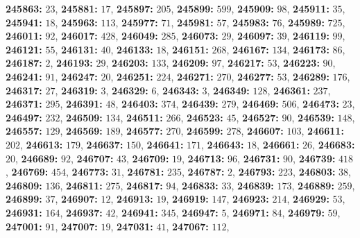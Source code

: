 \textsf{\bfseries 245863:} $23$, \textsf{\bfseries 245881:} $17$, \textsf{\bfseries 245897:} $205$, \textsf{\bfseries 245899:} $599$, \textsf{\bfseries 245909:} $98$, \textsf{\bfseries 245911:} $35$, \textsf{\bfseries 245941:} $18$, \textsf{\bfseries 245963:} $113$, \textsf{\bfseries 245977:} $71$, \textsf{\bfseries 245981:} $57$, \textsf{\bfseries 245983:} $76$, \textsf{\bfseries 245989:} $725$, \textsf{\bfseries 246011:} $92$, \textsf{\bfseries 246017:} $428$, \textsf{\bfseries 246049:} $285$, \textsf{\bfseries 246073:} $29$, \textsf{\bfseries 246097:} $39$, \textsf{\bfseries 246119:} $99$, \textsf{\bfseries 246121:} $55$, \textsf{\bfseries 246131:} $40$, \textsf{\bfseries 246133:} $18$, \textsf{\bfseries 246151:} $268$, \textsf{\bfseries 246167:} $134$, \textsf{\bfseries 246173:} $86$, \textsf{\bfseries 246187:} $2$, \textsf{\bfseries 246193:} $29$, \textsf{\bfseries 246203:} $133$, \textsf{\bfseries 246209:} $97$, \textsf{\bfseries 246217:} $53$, \textsf{\bfseries 246223:} $90$, \textsf{\bfseries 246241:} $91$, \textsf{\bfseries 246247:} $20$, \textsf{\bfseries 246251:} $224$, \textsf{\bfseries 246271:} $270$, \textsf{\bfseries 246277:} $53$, \textsf{\bfseries 246289:} $176$, \textsf{\bfseries 246317:} $27$, \textsf{\bfseries 246319:} $3$, \textsf{\bfseries 246329:} $6$, \textsf{\bfseries 246343:} $3$, \textsf{\bfseries 246349:} $128$, \textsf{\bfseries 246361:} $237$, \textsf{\bfseries 246371:} $295$, \textsf{\bfseries 246391:} $48$, \textsf{\bfseries 246403:} $374$, \textsf{\bfseries 246439:} $279$, \textsf{\bfseries 246469:} $506$, \textsf{\bfseries 246473:} $23$, \textsf{\bfseries 246497:} $232$, \textsf{\bfseries 246509:} $134$, \textsf{\bfseries 246511:} $266$, \textsf{\bfseries 246523:} $45$, \textsf{\bfseries 246527:} $90$, \textsf{\bfseries 246539:} $148$, \textsf{\bfseries 246557:} $129$, \textsf{\bfseries 246569:} $189$, \textsf{\bfseries 246577:} $270$, \textsf{\bfseries 246599:} $278$, \textsf{\bfseries 246607:} $103$, \textsf{\bfseries 246611:} $202$, \textsf{\bfseries 246613:} $179$, \textsf{\bfseries 246637:} $150$, \textsf{\bfseries 246641:} $171$, \textsf{\bfseries 246643:} $18$, \textsf{\bfseries 246661:} $26$, \textsf{\bfseries 246683:} $20$, \textsf{\bfseries 246689:} $92$, \textsf{\bfseries 246707:} $43$, \textsf{\bfseries 246709:} $19$, \textsf{\bfseries 246713:} $96$, \textsf{\bfseries 246731:} $90$, \textsf{\bfseries 246739:} $418$, \textsf{\bfseries 246769:} $454$, \textsf{\bfseries 246773:} $31$, \textsf{\bfseries 246781:} $235$, \textsf{\bfseries 246787:} $2$, \textsf{\bfseries 246793:} $223$, \textsf{\bfseries 246803:} $38$, \textsf{\bfseries 246809:} $136$, \textsf{\bfseries 246811:} $275$, \textsf{\bfseries 246817:} $94$, \textsf{\bfseries 246833:} $33$, \textsf{\bfseries 246839:} $173$, \textsf{\bfseries 246889:} $259$, \textsf{\bfseries 246899:} $37$, \textsf{\bfseries 246907:} $12$, \textsf{\bfseries 246913:} $19$, \textsf{\bfseries 246919:} $147$, \textsf{\bfseries 246923:} $214$, \textsf{\bfseries 246929:} $53$, \textsf{\bfseries 246931:} $164$, \textsf{\bfseries 246937:} $42$, \textsf{\bfseries 246941:} $345$, \textsf{\bfseries 246947:} $5$, \textsf{\bfseries 246971:} $84$, \textsf{\bfseries 246979:} $59$, \textsf{\bfseries 247001:} $91$, \textsf{\bfseries 247007:} $19$, \textsf{\bfseries 247031:} $41$, \textsf{\bfseries 247067:} $112$, 
